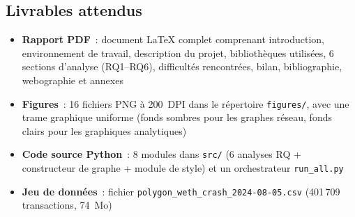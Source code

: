 
\subsection{Livrables attendus}

\begin{itemize}
  \item \textbf{Rapport PDF}~: document LaTeX complet comprenant introduction, environnement de travail, description du projet, biblioth\`eques utilis\'ees, 6 sections d'analyse (RQ1--RQ6), difficult\'es rencontr\'ees, bilan, bibliographie, webographie et annexes
  \item \textbf{Figures}~: 16 fichiers PNG \`a 200~DPI dans le r\'epertoire \texttt{figures/}, avec une trame graphique uniforme (fonds sombres pour les graphes r\'eseau, fonds clairs pour les graphiques analytiques)
  \item \textbf{Code source Python}~: 8 modules dans \texttt{src/} (6 analyses RQ + constructeur de graphe + module de style) et un orchestrateur \texttt{run\_all.py}
  \item \textbf{Jeu de donn\'ees}~: fichier \texttt{polygon\_weth\_crash\_2024-08-05.csv} (401\,709 transactions, 74~Mo)
\end{itemize}
